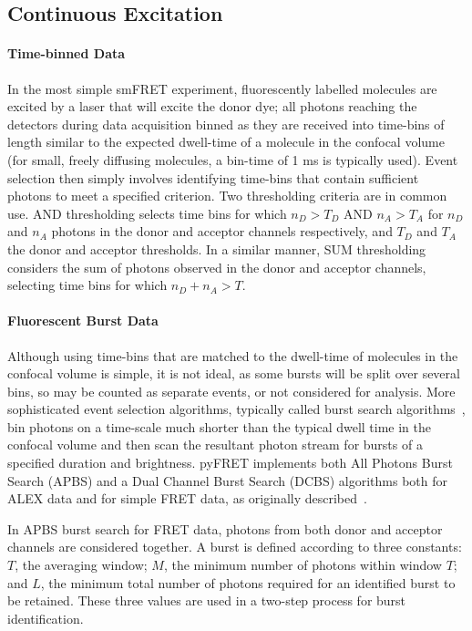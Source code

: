 \subsection{Continuous Excitation}
\paragraph{Time-binned Data}
In the most simple smFRET experiment, fluorescently labelled molecules are excited by a laser that will excite the donor dye; all photons reaching the detectors during data acquisition binned as they are received into time-bins of length similar to the expected dwell-time of a molecule in the confocal volume (for small, freely diffusing molecules, a bin-time of 1 ms is typically used). Event selection then simply involves identifying time-bins that contain sufficient photons to meet a specified criterion. Two thresholding criteria are in common use. AND thresholding selects time bins for which $n_D > T_D$ AND $n_A > T_A$ for $n_D$ and $n_A$ photons in the donor and acceptor channels respectively, and $T_D$ and $T_A$ the donor and acceptor thresholds. In a similar manner, SUM thresholding considers the sum of photons observed in the donor and acceptor channels, selecting time bins for which $n_D + n_A > T$.

\paragraph{Fluorescent Burst Data}
Although using time-bins that are matched to the dwell-time of molecules in the confocal volume is simple, it is not ideal, as some bursts will be split over several bins, so may be counted as separate events, or not considered for analysis. More sophisticated event selection algorithms, typically called burst search algorithms~\cite{nir06}, bin photons on a time-scale much shorter than the typical dwell time in the confocal volume and then scan the resultant photon stream for bursts of a specified duration and brightness. pyFRET implements both All Photons Burst Search (APBS) and a Dual Channel Burst Search (DCBS) algorithms both for ALEX data and for simple FRET data, as originally described~\cite{nir06}.

In APBS burst search for FRET data, photons from both donor and acceptor channels are considered together. A burst is defined according to three constants: $T$, the averaging window; $M$, the minimum number of photons within window $T$; and $L$, the minimum total number of photons required for an identified burst to be retained. These three values are used in a two-step process for burst identification.


